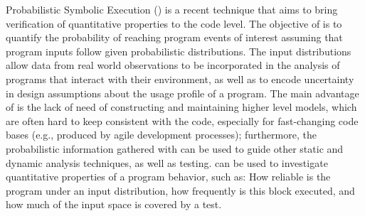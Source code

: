\documentclass[10pt]{article}
\newcounter{list}
\begin{document}
Probabilistic Symbolic Execution (\PSE{})
\cite{geldenhuys2012probabilistic,filieri2013reliability} is a recent
technique that aims to bring verification of quantitative properties
to the code level. The objective of \PSE{} is to quantify the
probability of reaching program events of interest assuming that
program inputs follow given probabilistic distributions. The input
distributions allow data from real world observations to be
incorporated in the analysis of programs that interact with their
environment, as well as to encode uncertainty in design assumptions
about the usage profile of a program. The main advantage of \PSE{} is
the lack of need of constructing and maintaining higher level models,
which are often hard to keep consistent with the code, especially for
fast-changing code bases (e.g., produced by agile development
processes); furthermore, the probabilistic information gathered with
\PSE{} can be used to guide other static and dynamic analysis
techniques, as well as testing. \PSE{} can be used to investigate
quantitative properties of a program behavior, such as: How reliable
is the program under an input distribution, how frequently is this
block executed, and how much of the input space is covered by a test.






\end{document}
